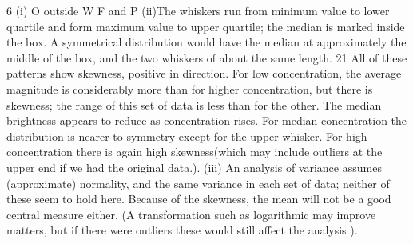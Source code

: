 6 (i)
O outside W F and P
(ii)The whiskers run from minimum value to lower quartile and form maximum value to
upper quartile; the median is marked inside the box. A symmetrical distribution would
have the median at approximately the middle of the box, and the two whiskers of about
the same length.
21
All of these patterns show skewness, positive in direction. For low concentration, the
average magnitude is considerably more than for higher concentration, but there is
skewness; the range of this set of data is less than for the other. The median brightness
appears to reduce as concentration rises. For median concentration the distribution is
nearer to symmetry except for the upper whisker.
For high concentration there is again high skewness(which may include outliers at the
upper end if we had the original data.).
(iii) An analysis of variance assumes (approximate) normality, and the same variance
in each set of data; neither of these seem to hold here. Because of the skewness, the
mean will not be a good central measure either.
(A transformation such as logarithmic may improve matters, but if there were outliers
these would still affect the analysis ).